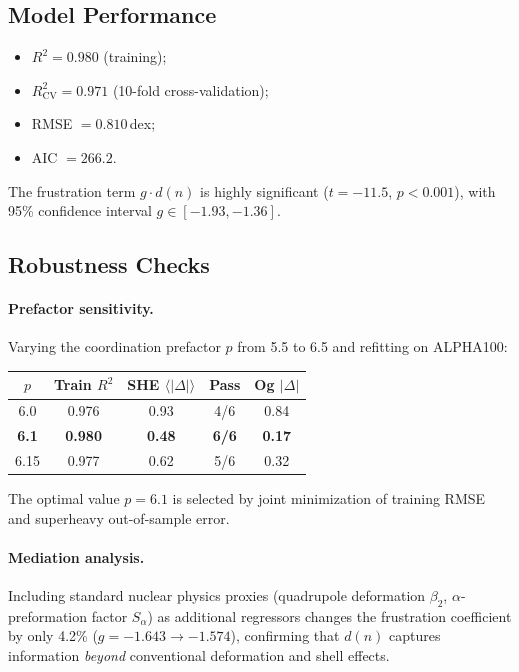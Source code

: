 \documentclass[12pt,a4paper,twocolumn]{revtex4-2}
\newcommand{\dn}{d(n)}
\begin{document}
\subsection{Model Performance}

\begin{itemize}
\item $R^2 = 0.980$ (training);
\item $R^2_{\mathrm{CV}} = 0.971$ (10-fold cross-validation);
\item RMSE $= 0.810$\,dex;
\item AIC $= 266.2$.
\end{itemize}

The frustration term $g \cdot \dn$ is highly significant
($t = -11.5$, $p < 0.001$), with 95\% confidence interval
$g \in [-1.93, -1.36]$.

\subsection{Robustness Checks}

\paragraph{Prefactor sensitivity.}
Varying the coordination prefactor $p$ from 5.5 to 6.5 and
refitting on ALPHA100:

\begin{center}
\begin{tabular}{@{}ccccc@{}}
\toprule
$p$ & Train $R^2$ & SHE $\langle|\Delta|\rangle$ & Pass & Og $|\Delta|$ \\
\midrule
6.0 & 0.976 & 0.93 & 4/6 & 0.84 \\
\textbf{6.1} & \textbf{0.980} & \textbf{0.48} & \textbf{6/6} & \textbf{0.17} \\
6.15 & 0.977 & 0.62 & 5/6 & 0.32 \\
\bottomrule
\end{tabular}
\end{center}

The optimal value $p = 6.1$ is selected by joint minimization of
training RMSE and superheavy out-of-sample error.

\paragraph{Mediation analysis.}
Including standard nuclear physics proxies (quadrupole deformation
$\beta_2$, $\alpha$-preformation factor $S_\alpha$) as additional
regressors changes the frustration coefficient by only 4.2\%
($g = -1.643 \to -1.574$), confirming that $\dn$ captures
information \emph{beyond} conventional deformation and shell
effects.
\end{document}
